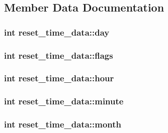 \subsection{Member Data Documentation}
\hypertarget{structreset__time__data_a6efbbdbd811a8d6c678a51beac313a94}{
\subsubsection[{day}]{\setlength{\rightskip}{0pt plus 5cm}int reset\-\_\-time\-\_\-data\-::day}}\label{structreset__time__data_a6efbbdbd811a8d6c678a51beac313a94}
\hypertarget{structreset__time__data_abdeb58a107e8bb7674f5d879027f71b9}{
\subsubsection[{flags}]{\setlength{\rightskip}{0pt plus 5cm}int reset\-\_\-time\-\_\-data\-::flags}}\label{structreset__time__data_abdeb58a107e8bb7674f5d879027f71b9}
\hypertarget{structreset__time__data_a62ede3dfbfbdc66afcb90471974a9bc5}{
\subsubsection[{hour}]{\setlength{\rightskip}{0pt plus 5cm}int reset\-\_\-time\-\_\-data\-::hour}}\label{structreset__time__data_a62ede3dfbfbdc66afcb90471974a9bc5}
\hypertarget{structreset__time__data_afa7cb8034b959b3b234125a81a7eaee7}{
\subsubsection[{minute}]{\setlength{\rightskip}{0pt plus 5cm}int reset\-\_\-time\-\_\-data\-::minute}}\label{structreset__time__data_afa7cb8034b959b3b234125a81a7eaee7}
\hypertarget{structreset__time__data_ab320b6195efd25d466a2e9bc295f305e}{
\subsubsection[{month}]{\setlength{\rightskip}{0pt plus 5cm}int reset\-\_\-time\-\_\-data\-::month}}\label{structreset__time__data_ab320b6195efd25d466a2e9bc295f305e}

